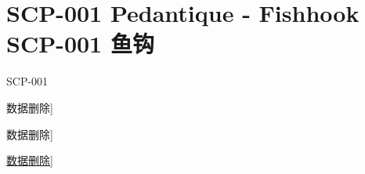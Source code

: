 \chapter[SCP-001 鱼钩]{
	SCP-001 Pedantique - Fishhook\\
	SCP-001 鱼钩
}

\label{chap:SCP-001.fish.hook}

SCP-001

\bb{项目等级：}{[}数据删除]

\bb{特殊收容措施：}{[}数据删除]

\bb{描述：}{[}\href{http://scp-wiki-cn.wdfiles.com/local--files/pedantique-s-proposal/Fishhook%20Aggregate%20Excessive%20%28rev24%29.html}{数据删除}]
